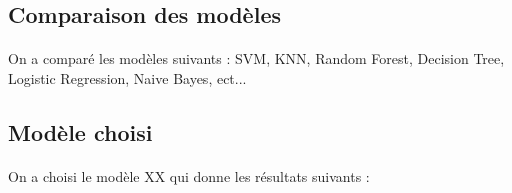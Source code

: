 \documentclass[11pt,a4paper]{article}
\begin{document}
\subsection{Comparaison des modèles}

\paragraph{} On a comparé les modèles suivants : SVM, KNN, Random Forest, Decision Tree, Logistic Regression, Naive Bayes, ect...

\subsection{Modèle choisi}

\paragraph{} On a choisi le modèle XX qui donne les résultats suivants :
\end{document}
